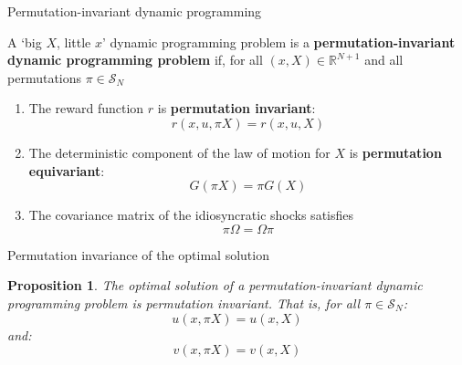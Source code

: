 \documentclass[aspectratio=169,10pt]{beamer}
\newcommand{\emphcolor}[1]{\textbf{\textcolor{emphcolorval}{#1}}}
\newtheorem{proposition}{Proposition}
\begin{document}
\begin{frame}{Permutation-invariant dynamic programming}
\begin{definition}
	A `big $X$, little $x$' dynamic programming problem is a \emphcolor{permutation-invariant dynamic programming problem} if, for all $(x,X)\in \mathbb{R}^{N+1}$ and all permutations $\pi \in \mathcal{S}_N$
	\begin{enumerate}
		\item The reward function $r$ is \emphcolor{permutation invariant}:
		\begin{equation*}
			r(x,u,\pi X) = r(x,u,X)
		\end{equation*}
		\item The deterministic component of the law of motion for $X$ is \emphcolor{permutation equivariant}:
		\begin{equation*}
			G(\pi X) = \pi G(X)\end{equation*}
		\item The covariance matrix of the idiosyncratic shocks satisfies
		\begin{equation*}
			\pi \Omega = \Omega\pi
		\end{equation*}
	\end{enumerate}
\end{definition}	
\end{frame}


\begin{frame}{Permutation invariance of the optimal solution}
	
	\begin{proposition}
		The optimal solution of a permutation-invariant dynamic programming problem is permutation invariant. That is, for all $\pi \in \mathcal{S}_N$:
		\begin{equation*}
			u(x,\pi X) = u(x,X)
		\end{equation*}
		and:
		\begin{equation*}
			v(x,\pi X) = v(x,X)
		\end{equation*}
		\vspace{-0.25in}
	\end{proposition}
\end{frame}
		
		
	
		

		
		
\end{document}
